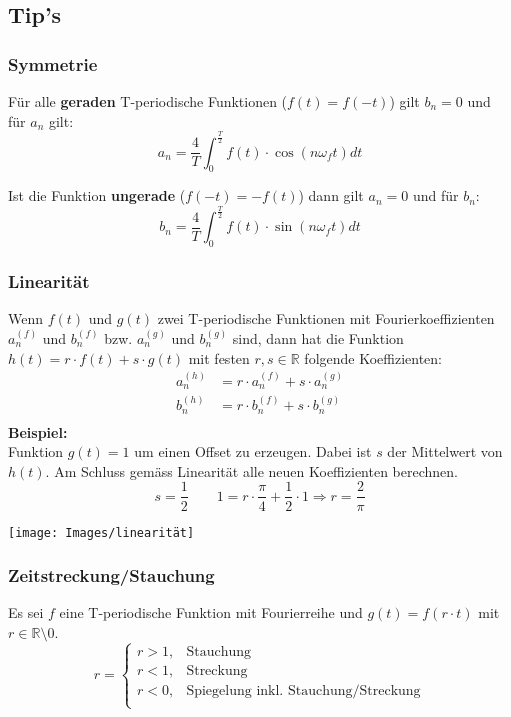 \subsection{Tip's}\label{tip}
\subsubsection{Symmetrie}
Für alle \textbf{geraden} T-periodische Funktionen ($f(t) = f(-t)$)  gilt $b_n = 0$ und für $a_n$ gilt: 
\[
a_n = \frac{4}{T}\int_{0}^{\frac{T}{2}}f(t) \cdot \cos(n\omega_f t)dt
\]

\noindent Ist die Funktion \textbf{ungerade} ($f(-t) = -f(t)$) dann gilt $a_n = 0$ und für $b_n$:
\[
	b_n = \frac{4}{T}\int_{0}^{\frac{T}{2}}f(t) \cdot \sin(n\omega_f t)dt 
\]


\subsubsection{Linearität}
Wenn $f(t)$ und $g(t)$ zwei T-periodische Funktionen mit Fourierkoeffizienten $a_n^{(f)}$ und $b_n^{(f)}$ bzw.  $a_n^{(g)}$ und $b_n^{(g)}$ sind, dann hat die Funktion $h(t) = r \cdot f(t) + s \cdot g(t)$ mit festen $r,s \in \mathbb{R}$ folgende Koeffizienten:
\begin{align*}
	a_n^{(h)} &= r \cdot a_n^{(f)} + s \cdot a_n^{(g)} \\
	b_n^{(h)} &= r \cdot b_n^{(f)} + s \cdot b_n^{(g)} \\
\end{align*}
\noindent\textbf{Beispiel:}~\\
\noindent Funktion $g(t) = 1$ um einen Offset zu erzeugen. Dabei ist $s$ der Mittelwert von $h(t)$. Am Schluss gemäss Linearität alle neuen Koeffizienten berechnen.
\[
	s = \frac{1}{2} \qquad
	1 = r\cdot \frac{\pi}{4} + \frac{1}{2} \cdot 1 \Rightarrow r = \frac{2}{\pi}
\]
\begin{center}
	\texttt{[image: Images/linearität]}
\end{center}

\subsubsection{Zeitstreckung/Stauchung}
Es sei $f$ eine T-periodische Funktion mit Fourierreihe und $g(t) = f(r \cdot t)$ mit $r \in \mathbb{R}\setminus0$.
\[
r = \begin{cases}
		r > 1, & \text{Stauchung}\\
		r < 1, & \text{Streckung}\\
		r < 0, & \text{Spiegelung inkl. Stauchung/Streckung}\\
	\end{cases}
\]

